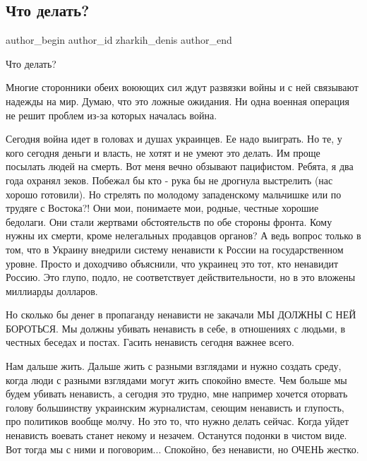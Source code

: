  
 
 
 
 
 
\subsection{Что делать?}
\label{sec:30_08_2014.fb.zharkih_denis.1.chto_delat}
 
\ifcmt
 author_begin
   author_id zharkih_denis
 author_end
\fi

Что делать?

Многие сторонники обеих воюющих сил ждут развязки войны и с ней связывают
надежды на мир. Думаю, что это ложные ожидания. Ни одна военная операция не
решит проблем из-за которых началась война. 

Сегодня война идет в головах и душах украинцев. Ее надо выиграть. Но те, у кого
сегодня деньги и власть, не хотят и не умеют это делать. Им проще посылать
людей на смерть. Вот меня вечно обзывают пацифистом. Ребята, я два года охранял
зеков. Побежал бы кто - рука бы не дрогнула выстрелить (нас хорошо готовили).
Но стрелять по молодому западенскому мальчишке или по трудяге с Востока?! Они
мои, понимаете мои, родные, честные хорошие бедолаги. Они стали жертвами
обстоятельств по обе стороны фронта.  Кому нужны их смерти, кроме нелегальных
продавцов органов? А ведь вопрос только в том, что в Украину внедрили систему
ненависти к России на государственном уровне. Просто и доходчиво объяснили, что
украинец это тот, кто ненавидит Россию. Это глупо, подло, не соответствует
действительности, но в это вложены миллиарды долларов. 

Но сколько бы денег в пропаганду ненависти не закачали МЫ ДОЛЖНЫ С НЕЙ
БОРОТЬСЯ. Мы должны убивать ненависть в себе, в отношениях с людьми, в честных
беседах и постах. Гасить ненависть сегодня важнее всего. 

Нам дальше жить. Дальше жить с разными взглядами и нужно создать среду, когда
люди с разными взглядами могут жить спокойно вместе. Чем больше мы будем
убивать ненависть, а сегодня это трудно, мне например хочется оторвать голову
большинству украинским журналистам, сеющим ненависть и глупость, про политиков
вообще молчу.  Но это то, что нужно делать сейчас. Когда уйдет ненависть
воевать станет некому и незачем. Останутся подонки в чистом виде. Вот тогда мы
с ними и поговорим... Спокойно, без ненависти, но ОЧЕНЬ жестко.

